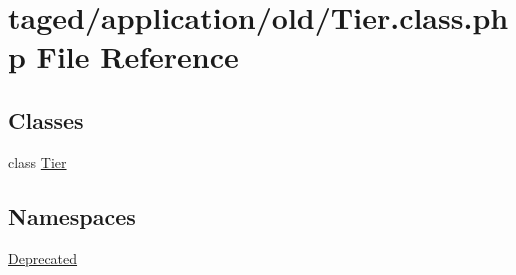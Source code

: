 \hypertarget{_tier_8class_8php}{}\section{taged/application/old/\+Tier.class.\+php File Reference}
\label{_tier_8class_8php}
\subsection*{Classes}
\begin{DoxyCompactItemize}
\item 
class \hyperlink{class_tier}{Tier}
\end{DoxyCompactItemize}
\subsection*{Namespaces}
\begin{DoxyCompactItemize}
\item 
 \hyperlink{namespace_deprecated}{Deprecated}
\end{DoxyCompactItemize}
